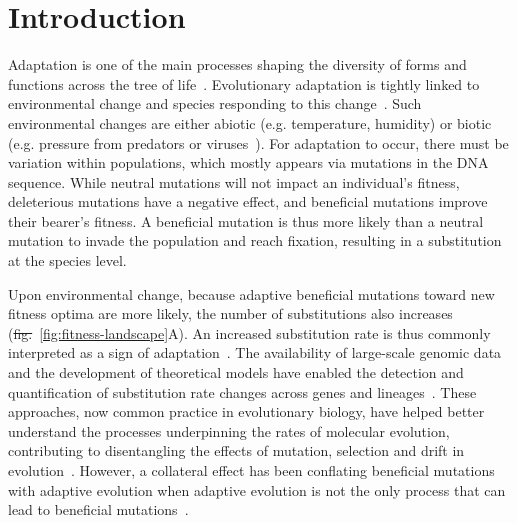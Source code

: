 \documentclass[10pt,letterpaper]{article}
\providecommand{\DIFaddtex}[1]{{\protect\color{blue}\uwave{#1}}} %
\providecommand{\DIFdeltex}[1]{{\protect\color{red}\sout{#1}}}                      %
\providecommand{\DIFaddbegin}{} %
\providecommand{\DIFaddend}{} %
\providecommand{\DIFdelbegin}{} %
\providecommand{\DIFdelend}{} %
\providecommand{\DIFadd}[1]{\texorpdfstring{\DIFaddtex{#1}}{#1}} %
\providecommand{\DIFdel}[1]{\texorpdfstring{\DIFdeltex{#1}}{}} %
\newcommand{\DIFscaledelfig}{0.5}
\newlength{\DIFdelgraphicswidth} %
\newlength{\DIFdelgraphicsheight} %
\newcommand{\DIFaddincludegraphics}[2][]{{\color{blue}\fbox{\DIFOincludegraphics[#1]{#2}}}} %
\newcommand{\DIFdelincludegraphics}[2][]{%
\sbox{\DIFdelgraphicsbox}{\DIFOincludegraphics[#1]{#2}}%
\settoboxwidth{\DIFdelgraphicswidth}{\DIFdelgraphicsbox} %
\settoboxtotalheight{\DIFdelgraphicsheight}{\DIFdelgraphicsbox} %
\scalebox{\DIFscaledelfig}{%
\parbox[b]{\DIFdelgraphicswidth}{\usebox{\DIFdelgraphicsbox}\\[-\baselineskip] \rule{\DIFdelgraphicswidth}{0em}}\llap{\resizebox{\DIFdelgraphicswidth}{\DIFdelgraphicsheight}{%
\setlength{\unitlength}{\DIFdelgraphicswidth}%
\begin{picture}(1,1)%
\thicklines\linethickness{2pt} %
{\color[rgb]{1,0,0}\put(0,0){\framebox(1,1){}}}%
{\color[rgb]{1,0,0}\put(0,0){\line( 1,1){1}}}%
{\color[rgb]{1,0,0}\put(0,1){\line(1,-1){1}}}%
\end{picture}%
}\hspace*{3pt}}} %
} %
\DeclareRobustCommand{\DIFaddbegin}{\DIFOaddbegin \let\includegraphics\DIFaddincludegraphics} %
\DeclareRobustCommand{\DIFaddend}{\DIFOaddend \let\includegraphics\DIFOincludegraphics} %
\DeclareRobustCommand{\DIFdelbegin}{\DIFOdelbegin \let\includegraphics\DIFdelincludegraphics} %
\DeclareRobustCommand{\DIFdelend}{\DIFOaddend \let\includegraphics\DIFOincludegraphics} %
\begin{document}
\DIFaddbegin \linenumbers


\DIFaddend \section*{Introduction}
Adaptation is one of the main processes shaping the diversity of forms and functions across the tree of life~\cite{darwin_origin_1859}.
Evolutionary adaptation is tightly linked to environmental change and species responding to this change~\cite{merrell_adaptive_1994, gavrilets_adaptive_2009}.
Such environmental changes are either abiotic (e.g. temperature, humidity) or biotic (e.g. pressure from predators or viruses~\cite{enard_viruses_2016}).
For adaptation to occur, there must be variation within populations, which mostly appears via mutations in the DNA sequence.
While neutral mutations will not impact an individual's fitness, deleterious mutations have a negative effect, and beneficial mutations improve their bearer's fitness.
A beneficial mutation is thus more likely than a neutral mutation to invade the population and reach fixation, resulting in a substitution at the species level.

Upon environmental change, because adaptive beneficial mutations toward new fitness optima are more likely, the number of substitutions also increases (\DIFdelbegin \DIFdel{fig.}\DIFdelend \DIFaddbegin \DIFadd{Fig}\DIFaddend ~\ref{fig:fitness-landscape}A).
An increased substitution rate is thus commonly interpreted as a sign of adaptation~\cite{mcdonald_adaptative_1991, smith_adaptive_2002, welch_estimating_2006}.
The availability of large-scale genomic data and the development of theoretical models have enabled the detection and quantification of substitution rate changes across genes and lineages~\cite{yang_statistical_2000, eyre-walker_genomic_2006, moutinho_variation_2019}.
These approaches, now common practice in evolutionary biology, have helped better understand the processes underpinning the rates of molecular evolution, contributing to disentangling the effects of mutation, selection and drift in evolution~\cite{lynch_mutation_2023}.
However, a collateral effect has been conflating beneficial mutations with adaptive evolution when adaptive evolution is not the only process that can lead to beneficial mutations~\cite{charlesworth_other_2007, mustonen_fitness_2009, jones_shifting_2017}.
\end{document}
